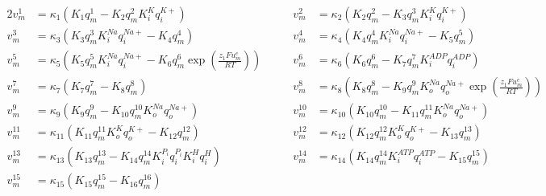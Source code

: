 \begin{alignat*}{2}
v_m^{1}  &= \kappa_1 \left( K_1 q_m^1 - K_2 q_m^2 K_i^{K} q_i^{K+} \right)
&\qquad
v_m^{2}  &= \kappa_2 \left( K_2 q_m^2 - K_3 q_m^3 K_i^{K} q_i^{K+} \right) \\[6pt]
v_m^{3}  &= \kappa_3 \left( K_3 q_m^3 K_i^{Na} q_i^{Na+} - K_4 q_m^4 \right)
&\qquad
v_m^{4}  &= \kappa_4 \left( K_4 q_m^4 K_i^{Na} q_i^{Na+} - K_5 q_m^5 \right) \\[6pt]
v_m^{5}  &= \kappa_5 \left( K_5 q_m^5 K_i^{Na} q_i^{Na+}
            - K_6 q_m^6 \exp\left( \frac{z_1 F u_m^e}{RT} \right) \right)
&\qquad
v_m^{6}  &= \kappa_6 \left( K_6 q_m^6 - K_7 q_m^7 K_i^{ADP} q_i^{ADP} \right) \\[6pt]
v_m^{7}  &= \kappa_7 \left( K_7 q_m^7 - K_8 q_m^8 \right)
&\qquad
v_m^{8}  &= \kappa_8 \left( K_8 q_m^8 - K_9 q_m^9 K_o^{Na} q_o^{Na+}
             \exp\left( \frac{z_1 F u_m^e}{RT} \right) \right) \\[6pt]
v_m^{9}  &= \kappa_9 \left( K_9 q_m^9 - K_{10} q_m^{10} K_o^{Na} q_o^{Na+} \right)
&\qquad
v_m^{10} &= \kappa_{10} \left( K_{10} q_m^{10} - K_{11} q_m^{11} K_o^{Na} q_o^{Na+} \right) \\[6pt]
v_m^{11} &= \kappa_{11} \left( K_{11} q_m^{11} K_o^{K} q_o^{K+} - K_{12} q_m^{12} \right)
&\qquad
v_m^{12} &= \kappa_{12} \left( K_{12} q_m^{12} K_o^{K} q_o^{K+} - K_{13} q_m^{13} \right) \\[6pt]
v_m^{13} &= \kappa_{13} \left( K_{13} q_m^{13}
             - K_{14} q_m^{14} K_i^{P_i} q_i^{P_i} K_i^{H} q_i^{H} \right)
&\qquad
v_m^{14} &= \kappa_{14} \left( K_{14} q_m^{14} K_i^{ATP} q_i^{ATP}
             - K_{15} q_m^{15} \right) \\[6pt]
v_m^{15} &= \kappa_{15} \left( K_{15} q_m^{15} - K_{16} q_m^{16} \right)
& &
\end{alignat*}
